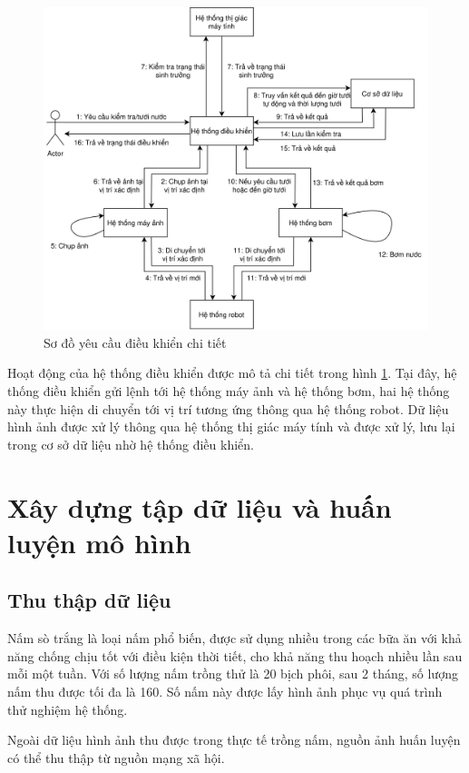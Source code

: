 \begin{figure}[H]
	\centering
	\includegraphics[width=0.8\linewidth]{images/collab-control-detail}
	\caption{Sơ đồ yêu cầu điều khiển chi tiết}
	\label{fig:collab-control-detail}
\end{figure}

Hoạt động của hệ thống điều khiển được mô tả chi tiết trong hình \ref{fig:collab-control-detail}. Tại đây, hệ thống điều khiển gửi lệnh tới hệ thống máy ảnh và hệ thống bơm, hai hệ thống này thực hiện di chuyển tới vị trí tương ứng thông qua hệ thống robot. Dữ liệu hình ảnh được xử lý thông qua hệ thống thị giác máy tính và được xử lý, lưu lại trong cơ sở dữ liệu nhờ hệ thống điều khiển.



\section{Xây dựng tập dữ liệu và huấn luyện mô hình}

\subsection{Thu thập dữ liệu}

Nấm sò trắng là loại nấm phổ biến, được sử dụng nhiều trong các bữa ăn với khả năng chống chịu tốt với điều kiện thời tiết, cho khả năng thu hoạch nhiều lần sau mỗi một tuần. Với số lượng nấm trồng thử là 20 bịch phôi, sau 2 tháng, số lượng nấm thu được tối đa là 160. Số nấm này được lấy hình ảnh phục vụ quá trình thử nghiệm hệ thống.

Ngoài dữ liệu hình ảnh thu được trong thực tế trồng nấm, nguồn ảnh huấn luyện có thể thu thập từ nguồn mạng xã hội.

